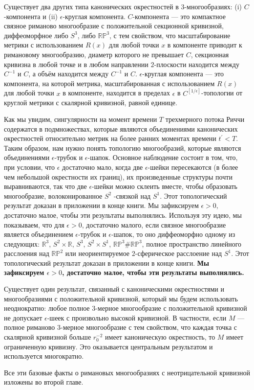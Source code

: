 Существует два других типа канонических окрестностей в $3$-многообразиях: 
(i) $C$-компонента и (ii) $\epsilon$-круглая компонента. $C$-компонента — это компактное 
связное риманово многообразие с положительной секционной кривизной, 
диффеоморфное либо $S^{3}$, либо $\mathbb{RP}^3$, с тем свойством, что масштабирование 
метрики с использованием $R(x)$ для любой точки $x$ в компоненте приводит к 
римановому многообразию, диаметр которого не превышает $C$, секционная 
кривизна в любой точке и в любом направлении $2$-плоскости находится между 
$C^{-1}$ и $C$, а объём находится между $C^{-1}$ и $C$. 
$\epsilon$-круглая компонента — это компонента, на которой метрика, масштабированная 
с использованием $R(x)$ для любой точки $x$ в компоненте, находится в пределах 
$\epsilon$ в $C^{[1/\epsilon]}$-топологии от круглой метрики с скалярной кривизной, 
равной единице.

Как мы увидим, сингулярности на момент времени $T$ трехмерного 
потока Риччи содержатся в подмножествах, которые являются 
объединениями канонических окрестностей относительно метрик 
на более ранних моментах времени $t^{\prime } <T$. Таким образом, нам 
нужно понять топологию многообразий, которые являются 
объединениями $\epsilon$-трубок и $\epsilon$-шапок. Основное наблюдение состоит 
в том, что, при условии, что $\epsilon$ достаточно мало, когда две 
$\epsilon$-шейки пересекаются (в более чем небольшой окрестности их 
границ), их произведенные структуры почти выравниваются, так 
что две $\epsilon$-шейки можно склеить вместе, чтобы образовать 
многообразие, волоконированное $S^2$ -связкой над $S^1$. 
Этот топологический результат доказан в приложении в конце 
книги. Мы зафиксируем $\epsilon >0$, достаточно малое, чтобы эти 
результаты выполнялись. Используя эту идею, мы показываем, 
что для $\epsilon >0$, достаточно малого, если связное многообразие 
является объединением $\epsilon$-трубок и $\epsilon$-шапок, то оно 
диффеоморфно одному из следующих: $\mathbb{R}^3$, 
$S^2 \times \mathbb{R}$, $S^3$, $S^2 \times S^1$, $\mathbb{RP}^3 \#\mathbb{RP}^3$, 
полное пространство линейного расслоения над 
$\mathbb{RP}^2$ или неориентируемое $2$-сферическое расслоение над 
$S^1$. Этот топологический результат доказан в приложении в конце книги. 
\textbf{Мы зафиксируем $\epsilon >0$, достаточно малое, чтобы эти результаты выполнялись.}

Существует один результат, связанный с каноническими окрестностями 
и многообразиями с положительной кривизной, который мы будем 
использовать неоднократно: любое полное $3$-мерное многообразие с 
положительной кривизной не допускает $\epsilon$-шеек с произвольно высокой 
кривизной. В частности, если $M$ — полное риманово $3$-мерное 
многообразие с тем свойством, что каждая точка с скалярной 
кривизной больше $r^{-2}_{0}$ имеет каноническую окрестность, то 
$M$ имеет ограниченную кривизну. 
Это оказывается центральным результатом и используется многократно. 

Все эти базовые факты о римановых многообразиях с неотрицательной кривизной 
изложены во второй главе.

